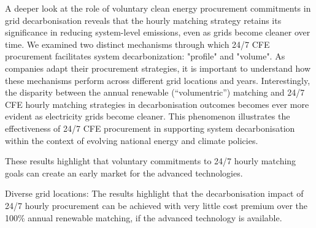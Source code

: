 A deeper look at the role of voluntary clean energy procurement commitments in grid decarbonisation reveals that the hourly matching strategy retains its significance in reducing system-level emissions, even as grids become cleaner over time.
We examined two distinct mechanisms through which 24/7 CFE procurement facilitates system decarbonization: "profile" and "volume".
As companies adapt their procurement strategies, it is important to understand how these mechanisms perform across different grid locations and years.
Interestingly, the disparity between the annual renewable (\enquote{volumentric}) matching and 24/7 CFE hourly matching strategies in decarbonisation outcomes becomes ever more evident as electricity grids become cleaner.
This phenomenon illustrates the effectiveness of 24/7 CFE procurement in supporting system decarbonisation within the context of evolving national energy and climate policies.


These results highlight that voluntary commitments to 24/7 hourly matching goals can create an early market for the advanced technologies.

Diverse grid locations:
The results highlight that the decarbonisation impact of 24/7 hourly procurement can be achieved with very little cost premium over the 100\% annual renewable matching, if the advanced technology is available.
